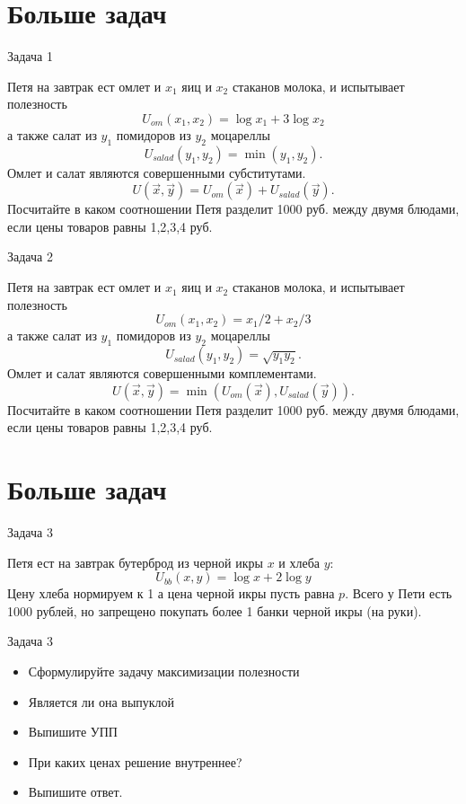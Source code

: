 \documentclass{beamer}
\begin{document}
\section{Больше задач}

\begin{frame}{Задача 1}

Петя на завтрак ест омлет и $x_1$ яиц и $x_2$ стаканов молока, и испытывает полезность $$ U_{om}(x_1,x_2) = \log x_1 + 3 \log x_2$$  
а также салат из $y_1$ помидоров из $y_2$ моцареллы $$ U_{salad}(y_1,y_2) = \min(y_1,y_2).$$
Омлет и салат являются совершенными субститутами.
$$ U(\vec x, \vec y) = U_{om}(\vec x) + U_{salad}(\vec y).$$
Посчитайте в каком соотношении Петя разделит 1000 руб. между двумя блюдами, если цены товаров равны 1,2,3,4 руб.

\end{frame}

\begin{frame}{Задача 2}

Петя на завтрак ест омлет и $x_1$ яиц и $x_2$ стаканов молока, и испытывает полезность $$ U_{om}(x_1,x_2) = x_1/2 + x_2/3$$  
а также салат из $y_1$ помидоров из $y_2$ моцареллы $$ U_{salad}(y_1,y_2) = \sqrt{y_1 y_2}.$$
Омлет и салат являются совершенными комплементами.
$$ U(\vec x, \vec y) = \min(U_{om}(\vec x),U_{salad}(\vec y)).$$
Посчитайте в каком соотношении Петя разделит 1000 руб. между двумя блюдами, если цены товаров равны 1,2,3,4 руб.

\end{frame}

\section{Больше задач}

\begin{frame}{Задача 3}

Петя ест на завтрак бутерброд из черной икры $x$ и хлеба $y$:
$$ U_{bb}(x,y) = \log x + 2 \log y$$
Цену хлеба нормируем к 1 а цена черной икры пусть равна $p$. Всего у Пети есть 1000 рублей, но запрещено покупать более 1 банки черной икры (на руки).

\end{frame}

\begin{frame}{Задача 3}

\begin{itemize}
  \item Сформулируйте задачу максимизации полезности
  \item Является ли она выпуклой
  \item Выпишите УПП
  \item При каких ценах решение внутреннее?
  \item Выпишите ответ.
\end{itemize}

\end{frame}
\end{document}

